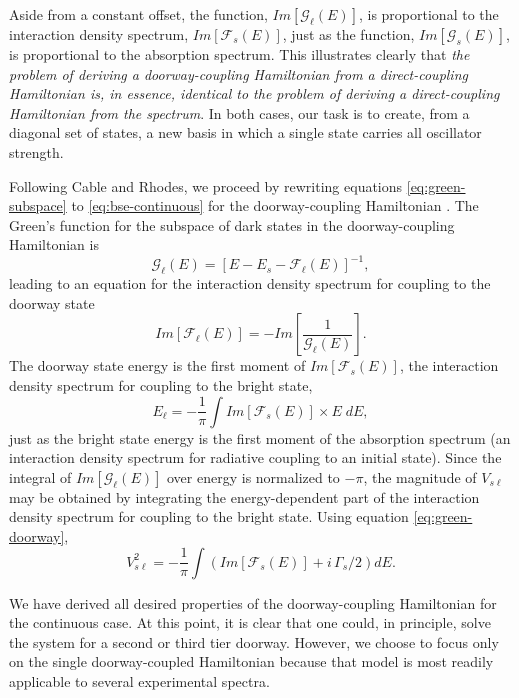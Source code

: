 Aside from a constant offset, the function,
$Im[\mathcal{G}_{\ell}(E)]$, is proportional to the interaction
density spectrum, $Im[\mathcal{F}_s(E)]$, just as the function,
$Im[\mathcal{G}_s(E)]$, is proportional to the absorption spectrum.
This illustrates clearly that \emph{the problem of deriving a
  doorway-coupling Hamiltonian from a direct-coupling Hamiltonian is,
  in essence, identical to the problem of deriving a direct-coupling
  Hamiltonian from the spectrum}.  In both cases, our task is to
create, from a diagonal set of states, a new basis in which a single
state carries all oscillator strength.

Following Cable and Rhodes, we proceed by rewriting equations
\ref{eq:green-subspace} to \ref{eq:bse-continuous} for the
doorway-coupling Hamiltonian \cite{cable80}.  The Green's function for
the subspace of dark states in the doorway-coupling Hamiltonian is
\begin{equation}
  \label{eq:green-doorway-subspace}
  \mathcal{G}_{\ell}(E) = [E - E_s - \mathcal{F}_{\ell}(E)]^{-1},
\end{equation}
leading to an equation for the interaction density spectrum for
coupling to the doorway state
\begin{equation}
  \label{eq:idf}
  Im[\mathcal{F}_{\ell}(E)] = - Im \left [
    \frac{1}{\mathcal{G}_{\ell}(E)}
  \right ].
\end{equation}
The doorway state energy is the first moment of
$Im[\mathcal{F}_{s}(E)]$, the interaction density spectrum for
coupling to the bright state,
\begin{equation}
  \label{eq:dse-continuous}
  E_{\ell} = - \frac{1}{\pi} \int Im[\mathcal{F}_s(E)] \times E \; dE,
\end{equation}
just as the bright state energy is the first moment of the absorption
spectrum (an interaction density spectrum for radiative coupling to an
initial state).  Since the integral of $Im[\mathcal{G}_{\ell}(E)]$
over energy is normalized to $-\pi$, the magnitude of $V_{s\ell}$ may
be obtained by integrating the energy-dependent part of the interaction
density spectrum for coupling to the bright state.  Using equation
\ref{eq:green-doorway},
\begin{equation}
  V_{s\ell}^2 = -\frac{1}{\pi} \int \left (
    Im[\mathcal{F}_s(E)] + i \, \Gamma_s / 2
  \right ) dE.
\end{equation}

We have derived all desired properties of the doorway-coupling
Hamiltonian for the continuous case.  At this point, it is clear that
one could, in principle, solve the system for a second or third
tier doorway.  However, we choose to focus only on the single
doorway-coupled Hamiltonian because that model is most readily
applicable to several experimental spectra.

